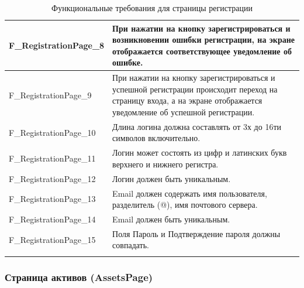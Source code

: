 \documentclass[a4paper, 14pt]{article}
\begin{document}
\begin{longtable}{| p{} | p{} |}
    F\_RegistrationPage\_8          & При нажатии на кнопку зарегистрироваться и возникновении ошибки регистрации, на экране отображается соответствующее уведомление об ошибке.                                         \\ \hline
    F\_RegistrationPage\_9          & При нажатии на кнопку зарегистрироваться и успешной регистрации происходит переход на страницу входа, а на экране отображается уведомление об успешной регистрации.                \\ \hline
    F\_RegistrationPage\_10         & Длина логина должна составлять от 3х до 16ти символов включительно.                                                                                                                \\ \hline
    F\_RegistrationPage\_11         & Логин может состоять из цифр и латинских букв верхнего и нижнего регистра.                                                                                                         \\ \hline
    F\_RegistrationPage\_12         & Логин должен быть уникальным.                                                                                                         \\ \hline
    F\_RegistrationPage\_13         & Email должен содержать имя пользователя, разделитель (@), имя почтового сервера.                                                                                                         \\ \hline
    F\_RegistrationPage\_14         & Email должен быть уникальным.                                                                                                         \\ \hline
    F\_RegistrationPage\_15         & Поля Пароль и Подтверждение пароля должны совпадать.                                                                                                         \\ \hline

    \caption{Функциональные требования для страницы регистрации}
\end{longtable}

\subsubsection{Страница активов (AssetsPage)}
\end{document}
